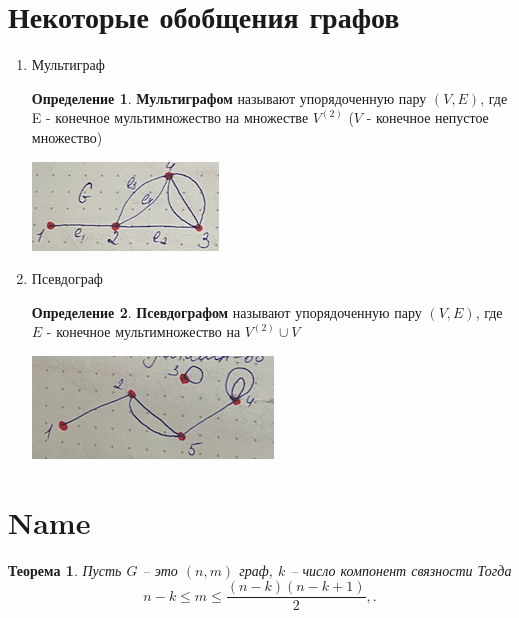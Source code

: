 \documentclass[a4paper, 12pt]{article}
\newtheorem*{theorem*}{Теорема}
\theoremstyle{definition}
\newtheorem*{definition*}{Определение}
\theoremstyle{definition}
\renewcommand{\leq}{\leqslant}
\begin{document}
  \section{Некоторые обобщения графов}
  \begin{enumerate}
    \item Мультиграф
    
    \begin{definition*}
      \textbf{Мультиграфом} называют упорядоченную пару $(V,E)$, где E - конечное мультимножество на множестве $V^{(2)}$ ($V$ - конечное непустое множество)

      \includegraphics{image.png}
    \end{definition*}
    \item Псевдограф
    
    \begin{definition*}
      \textbf{Псевдографом} называют упорядоченную пару $(V,E)$, где $E$ - конечное мультимножество на $V^{(2)}\cup V$

      \includegraphics{pseudo.png}
    \end{definition*}
    
  \end{enumerate}
  \section{Name}
  \begin{theorem*}
    Пусть $G$ -- это $(n,m)$ граф, $k$ -- число компонент связности
    Тогда
    $$n-k\leq{m}\leq\frac{(n-k)(n-k+1)}{2},.$$
  \end{theorem*}
  
\end{document}
